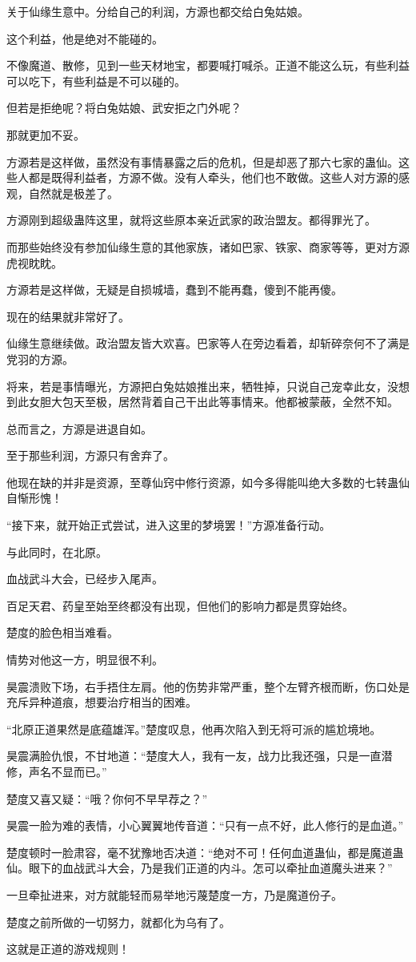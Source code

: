\begin{this_body}
关于仙缘生意中。分给自己的利润，方源也都交给白兔姑娘。

这个利益，他是绝对不能碰的。

不像魔道、散修，见到一些天材地宝，都要喊打喊杀。正道不能这么玩，有些利益可以吃下，有些利益是不可以碰的。

但若是拒绝呢？将白兔姑娘、武安拒之门外呢？

那就更加不妥。

方源若是这样做，虽然没有事情暴露之后的危机，但是却恶了那六七家的蛊仙。这些人都是既得利益者，方源不做。没有人牵头，他们也不敢做。这些人对方源的感观，自然就是极差了。

方源刚到超级蛊阵这里，就将这些原本亲近武家的政治盟友。都得罪光了。

而那些始终没有参加仙缘生意的其他家族，诸如巴家、铁家、商家等等，更对方源虎视眈眈。

方源若是这样做，无疑是自损城墙，蠢到不能再蠢，傻到不能再傻。

现在的结果就非常好了。

仙缘生意继续做。政治盟友皆大欢喜。巴家等人在旁边看着，却斩碎奈何不了满是党羽的方源。

将来，若是事情曝光，方源把白兔姑娘推出来，牺牲掉，只说自己宠幸此女，没想到此女胆大包天至极，居然背着自己干出此等事情来。他都被蒙蔽，全然不知。

总而言之，方源是进退自如。

至于那些利润，方源只有舍弃了。

他现在缺的并非是资源，至尊仙窍中修行资源，如今多得能叫绝大多数的七转蛊仙自惭形愧！

“接下来，就开始正式尝试，进入这里的梦境罢！”方源准备行动。

与此同时，在北原。

血战武斗大会，已经步入尾声。

百足天君、药皇至始至终都没有出现，但他们的影响力都是贯穿始终。

楚度的脸色相当难看。

情势对他这一方，明显很不利。

昊震溃败下场，右手捂住左肩。他的伤势非常严重，整个左臂齐根而断，伤口处是充斥异种道痕，想要治疗相当的困难。

“北原正道果然是底蕴雄浑。”楚度叹息，他再次陷入到无将可派的尴尬境地。

昊震满脸仇恨，不甘地道：“楚度大人，我有一友，战力比我还强，只是一直潜修，声名不显而已。”

楚度又喜又疑：“哦？你何不早早荐之？”

昊震一脸为难的表情，小心翼翼地传音道：“只有一点不好，此人修行的是血道。”

楚度顿时一脸肃容，毫不犹豫地否决道：“绝对不可！任何血道蛊仙，都是魔道蛊仙。眼下的血战武斗大会，乃是我们正道的内斗。怎可以牵扯血道魔头进来？”

一旦牵扯进来，对方就能轻而易举地污蔑楚度一方，乃是魔道份子。

楚度之前所做的一切努力，就都化为乌有了。

这就是正道的游戏规则！

\end{this_body}

